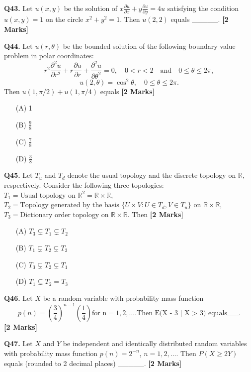 \documentclass[11pt]{article}
\newcommand{\questionb}[2]{
    \noindent\textbf{Q#2.} #1 \hfill \textbf{[2 Marks]}
}
\begin{document}
\questionb{Let \( u(x, y) \) be the solution of \( x \frac{\partial u}{\partial x} + y \frac{\partial u}{\partial y} = 4u \) satisfying the condition \( u(x, y) = 1 \) on the circle \( x^2 + y^2 = 1 \). Then \( u(2, 2) \) equals \_\_\_\_\_.}{43}
\vspace{0.5cm}

\questionb{Let \( u(r, \theta) \) be the bounded solution of the following boundary value problem in polar coordinates:
\[r^2 \frac{\partial^2 u}{\partial r^2} + r \frac{\partial u}{\partial r} + \frac{\partial^2 u}{\partial \theta^2} = 0, \quad 0 < r < 2 \quad \text{and} \quad 0 \leq \theta \leq 2\pi,\]
\[u(2, \theta) = \cos^2 \theta, \quad 0 \leq \theta \leq 2\pi.\]
Then \( u(1, \pi / 2) + u(1, \pi / 4) \) equals}{44}
\begin{enumerate}
    \item[(A)] 1  
    \item[(B)] \(\frac{9}{8}\)  
    \item[(C)] \(\frac{7}{8}\)  
    \item[(D)] \(\frac{3}{8}\)  
\end{enumerate}
\vspace{0.5cm}

\questionb{Let \( T_u \) and \( T_d \) denote the usual topology and the discrete topology on \( \mathbb{R} \), respectively. Consider the following three topologies:
\( T_1 = \text{Usual topology on } \mathbb{R}^2 = \mathbb{R} \times \mathbb{R}, \)
\( T_2 = \text{Topology generated by the basis } \{U \times V: U \in T_d, V \in T_u\} \text{ on } \mathbb{R} \times \mathbb{R}, \)
\( T_3 = \text{Dictionary order topology on } \mathbb{R} \times \mathbb{R}. \)
Then}{45}
\begin{enumerate}
    \item[(A)] \( T_3 \subsetneq T_1 \subsetneq T_2 \)  
    \item[(B)] \( T_1 \subsetneq T_2 \subsetneq T_3 \)  
    \item[(C)] \( T_3 \subsetneq T_2 \subsetneq T_1 \)  
    \item[(D)] \( T_1 \subsetneq T_2 = T_3 \)  
\end{enumerate}
\vspace{0.5cm}

\questionb{Let \( X \) be a random variable with probability mass function
\[p(n) = \left( \frac{3}{4} \right)^{n-1} \left( \frac{1}{4} \right)  \text{for n} = 1, 2, \ldots . \text{Then E(X - 3 | X > 3)  equals} \_\_\_\_\_.\]}{46}
\vspace{0.5cm}
\questionb{Let \( X \) and \( Y \) be independent and identically distributed random variables with probability mass function \( p(n) = 2^{-n} \), \( n = 1, 2, \ldots \). Then \( P(X \geq 2Y) \) equals (rounded to 2 decimal places) \_\_\_\_\_.}{47}
\vspace{0.5cm}
\end{document}
